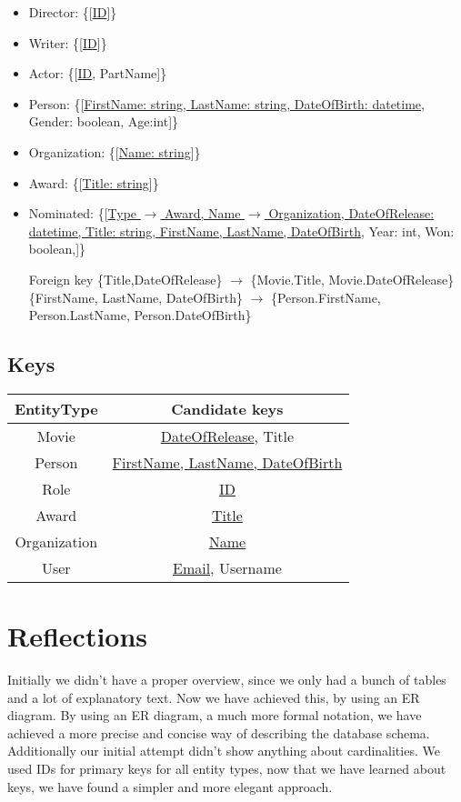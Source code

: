 \begin{itemize}
\item Director: \{[\underline{ID}]\}

\item Writer: \{[\underline{ID}]\}

\item Actor: \{[\underline{ID}, PartName]\}

\item Person: \{[\underline{FirstName: string, LastName: string, DateOfBirth: datetime}, Gender: boolean, Age:int]\}

\item Organization: \{[\underline{Name: string}]\}

\item Award: \{[\underline{Title: string}]\}

\item Nominated: \{[\underline{Type $ \rightarrow $ Award, Name $ \rightarrow $ Organization, DateOfRelease: datetime, Title: string, FirstName, LastName, DateOfBirth}, Year: int, Won: boolean,]\}

Foreign key \{Title,DateOfRelease\} $ \rightarrow $ \{Movie.Title, Movie.DateOfRelease\}
		\{FirstName, LastName, DateOfBirth\} $ \rightarrow $ \{Person.FirstName, Person.LastName, 
Person.DateOfBirth\}
\end{itemize}

\subsection{Keys}

\begin{tabular}{| c | c |}
\hline
EntityType & Candidate keys\\
\hline 
\hline
Movie & \underline{DateOfRelease}, Title\\
\hline
Person & \underline{FirstName, LastName, DateOfBirth}\\
\hline
Role & \underline{ID}\\
\hline
\hline 
Award & \underline{Title}\\
\hline
Organization & \underline{Name}\\
\hline
User & \underline{Email}, Username\\
\hline
\end{tabular}

\section{Reflections}
Initially we didn't have a proper overview, since we only had a bunch of tables and a lot of explanatory text.
Now we have achieved this, by using an ER diagram.
By using an ER diagram, a much more formal notation, we have achieved a more precise and concise way of describing the database schema.
Additionally our initial attempt didn't show anything about cardinalities.
We used IDs for primary keys for all entity types, now that we have learned about keys, we have found a simpler and more elegant approach.
